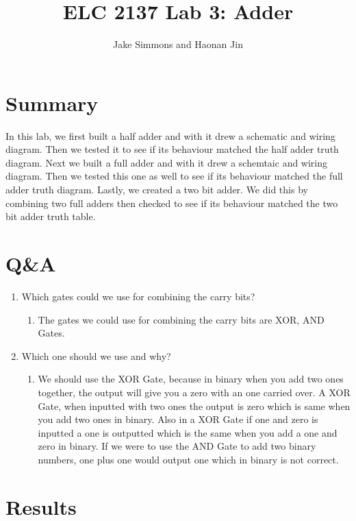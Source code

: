 \documentclass[11pt]{article}
\begin{document}
\title{ELC 2137 Lab 3: Adder}
\author{Jake Simmons and Haonan Jin}

\maketitle


\section*{Summary}

In this lab, we first built a half adder and with it drew a schematic and wiring diagram. Then we tested it to see if its behaviour matched the half adder truth diagram. Next we built a full adder and with it drew a schemtaic and wiring diagram. Then we tested this one as well to see if its behaviour matched the full adder truth diagram. Lastly, we created a two bit adder. We did this by combining two full adders then checked to see if its behaviour matched the two bit adder truth table.  


\section*{Q\&A}

\begin{enumerate}
	\item Which gates could we use for combining the carry bits?
	\begin{enumerate}
		\item The gates we could use for combining the carry bits are XOR, AND Gates.
	\end{enumerate}
    \item Which one should we use and why?
    \begin{enumerate}
    	\item We should use the XOR Gate, because in binary when you add two ones together, the output will give you a zero with an one carried over. A XOR Gate, when inputted with two ones the output is zero which is same when you add two ones in binary. Also in a XOR Gate if one and zero is inputted a one is outputted which is the same when you add a one and zero in binary. If we were to use the AND Gate to add two binary numbers, one plus one would output one which in binary is not correct.
    \end{enumerate}
\end{enumerate}



\section*{Results}
\end{document}
